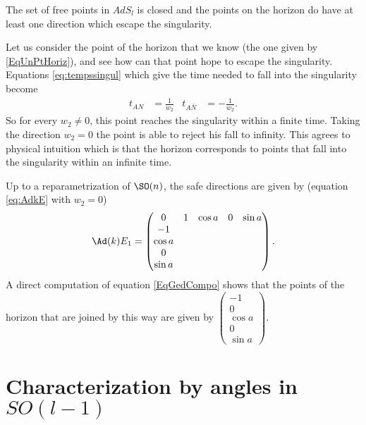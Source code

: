 \begin{corollary}		\label{CorTNFermeHorEchape}
The set of free points in $AdS_l$ is closed and the points on the horizon do have at least one direction which escape the singularity.
\end{corollary}

Let us consider the point of the horizon that we know (the one given by \eqref{EqUnPtHoriz}), and see how can that point hope to escape the singularity.  Equations \eqref{eq:tempssingul} which give the time needed to fall into the singularity become
\begin{align}
  t_{AN}&=\frac{1}{w_{2}}&t_{A \bar{N}}&=-\frac{1}{w_{2}}.
\end{align}
So for every $w_{2}\neq 0$, this point reaches the singularity within a finite time. Taking the direction $w_{2}=0$ the point is able to reject his fall to infinity. This agrees to physical intuition which is that the horizon corresponds to points that fall into the singularity within an infinite time.

Up to a reparametrization of $\SO(n)$, the safe directions are given by (equation \eqref{eq:AdkE} with $w_2=0$)
\[
   \Ad(k)E_1=
\begin{pmatrix}
0&1&\cos a&0&\sin a\\
-1\\
\cos a\\
0\\
\sin a
\end{pmatrix}.
\]
A direct  computation of equation \eqref{EqGedCompo}  shows that the points of the horizon that are joined by this way are given by
$
\begin{pmatrix}
-1\\
0\\
\cos a\\
0\\
\sin a
\end{pmatrix}.
$

\section{Characterization by angles in \texorpdfstring{$SO(l-1)$}{SOl-1}}

